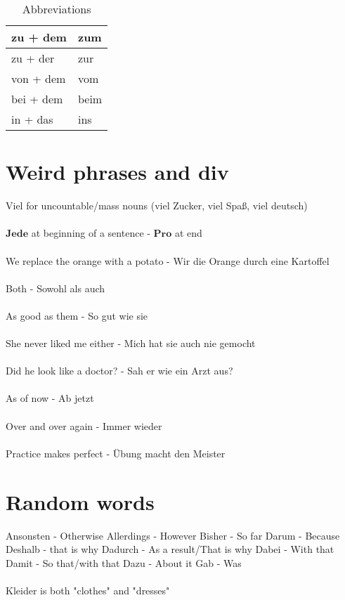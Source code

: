 \documentclass{article}
\begin{document}
\begin{table}[H]
    \centering
    \begin{tabu} to 0.4\textwidth { | X[l] | X[r] | }
        \hline
        zu + dem & zum\\
        \hline
        zu + der &  zur\\
        \hline
        von + dem &  vom\\
        \hline
        bei + dem &  beim\\
        \hline
        in + das &  ins\\
        \hline
    \end{tabu}
    \caption{Abbreviations}
    \label{tab:abbreviations}
\end{table}


\section{Weird phrases and div}
Viel for uncountable/mass nouns (viel Zucker, viel Spaß, viel deutsch) 
\\ \\
$\textbf{Jede}$ at beginning of a sentence - $\textbf{Pro}$ at end
\\ \\
We replace the orange with a potato - Wir  die Orange durch eine Kartoffel
\\ \\
Both - Sowohl als auch
\\ \\
As good as them - So gut wie sie
\\ \\
She never liked me either - Mich hat sie auch nie gemocht
\\ \\
Did he look like a doctor? - Sah er wie ein Arzt aus?
\\ \\
As of now - Ab jetzt
\\ \\
Over and over again - Immer wieder
\\ \\
Practice makes perfect - Übung macht den Meister


\section{Random words}
Ansonsten - Otherwise
Allerdings - However
Bisher - So far
Darum - Because
Deshalb - that is why
Dadurch - As a result/That is why
Dabei - With that
Damit - So that/with that
Dazu - About it
Gab - Was
\\ \\
Kleider is both "clothes" and "dresses"
\end{document}
